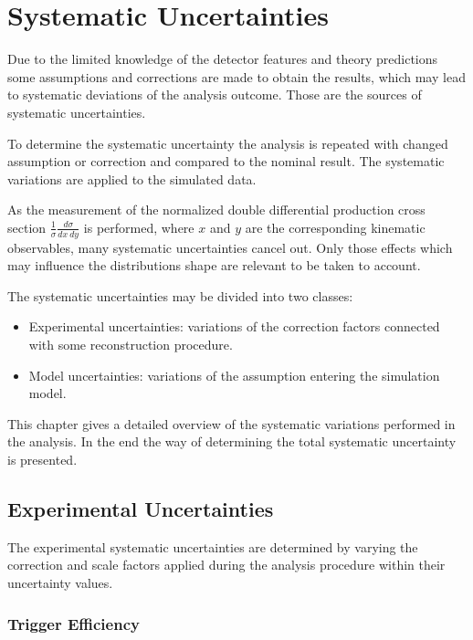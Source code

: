 \chapter{Systematic Uncertainties}

Due to the limited knowledge of the detector features and theory predictions some assumptions and corrections are
made to obtain the results, which may lead to systematic deviations of the analysis outcome.
Those are the sources of systematic uncertainties.

To determine the systematic uncertainty the analysis is repeated with changed assumption or correction and compared
to the nominal result. The systematic variations are applied to the simulated data.

As the measurement of the normalized double differential production cross section $\frac{1}{\sigma} \frac{d\sigma}{dx\:dy}$
is performed, where $x$ and $y$ are the corresponding kinematic observables, many systematic uncertainties cancel
out. Only those effects which may influence the distributions shape are relevant to be taken to account.

The systematic uncertainties may be divided into two classes:
\begin{itemize}
 \item Experimental uncertainties: variations of the correction factors connected with some reconstruction procedure.
 \item Model uncertainties: variations of the assumption entering the simulation model.
\end{itemize}

This chapter gives a detailed overview of the systematic variations performed in the analysis. In the end the way
of determining the total systematic uncertainty is presented.

\section{Experimental Uncertainties}

The experimental systematic uncertainties are determined by varying the correction and scale factors applied during the
analysis procedure within their uncertainty values.

\subsection{Trigger Efficiency}

